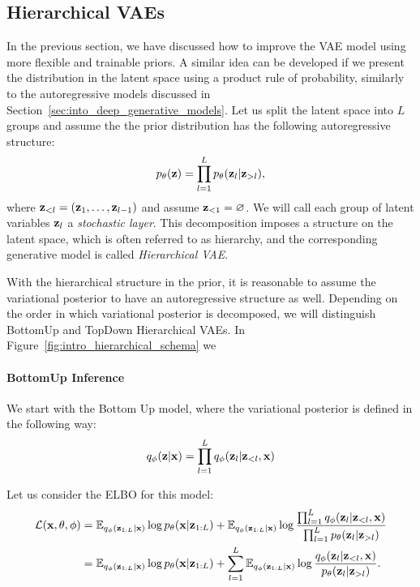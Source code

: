 \subsection{Hierarchical VAEs}
In the previous section, we have discussed how to improve the VAE model using more flexible and trainable priors.
A similar idea can be developed if we present the distribution in the latent space using a product rule of probability, similarly to the autoregressive models discussed in Section~\ref{sec:into_deep_generative_models}. Let us split the latent space into $L$ groups and assume the the prior distribution has the following autoregressive structure:
\begin{equation}
    p_{\theta}({\mathbf{z}}) = \prod_{l=1}^L p_{\theta}({\mathbf{z}}_l|{\mathbf{z}}_{>l}),
\end{equation}
where ${\mathbf{z}}_{<l} = ({\mathbf{z}}_1, \dots, {\mathbf{z}}_{l-1})$ and assume ${\mathbf{z}}_{<1} = \varnothing$. We will call each group of latent variables ${\mathbf{z}}_l$ a \textit{stochastic layer}. This decomposition imposes a structure on the latent space, which is often referred to as hierarchy, and the corresponding generative model is called \textit{Hierarchical VAE}. 

With the hierarchical structure in the prior, it is reasonable to assume the variational posterior to have an autoregressive structure as well. Depending on the order in which variational posterior is decomposed, we will distinguish BottomUp and TopDown Hierarchical VAEs. In Figure~\ref{fig:intro_hierarchical_schema} we 

\paragraph{BottomUp Inference}
We start with the Bottom Up model, where the variational posterior is defined in the following way:
\begin{equation}
    q_{\phi}({\mathbf{z}}|{\mathbf{x}}) = \prod_{l=1}^L q_{\phi}({\mathbf{z}}_l|{\mathbf{z}}_{<l}, {\mathbf{x}})
\end{equation}

Let us consider the ELBO for this model:
\begin{align}
    \mathcal{L}({\mathbf{x}}, \theta, \phi) &= \mathbb{E}_{q_{\phi}({\mathbf{z}}_{1:L}|{\mathbf{x}})}\log p_{\theta}({\mathbf{x}}|{\mathbf{z}}_{1:L}) + \mathbb{E}_{q_{\phi}({\mathbf{z}}_{1:L}|{\mathbf{x}})} \log \frac{\prod_{l=1}^L q_{\phi}({\mathbf{z}}_l|{\mathbf{z}}_{<l}, {\mathbf{x}})}{\prod_{l=1}^L p_{\theta}({\mathbf{z}}_l|{\mathbf{z}}_{>l})} \\
    &=\mathbb{E}_{q_{\phi}({\mathbf{z}}_{1:L}|{\mathbf{x}})}\log p_{\theta}({\mathbf{x}}|{\mathbf{z}}_{1:L}) +  \sum_{l=1}^L \mathbb{E}_{q_{\phi}({\mathbf{z}}_{1:L}|{\mathbf{x}})}\log \frac{ q_{\phi}({\mathbf{z}}_l|{\mathbf{z}}_{<l}, {\mathbf{x}})}{p_{\theta}({\mathbf{z}}_l|{\mathbf{z}}_{>l})}.
\end{align}

